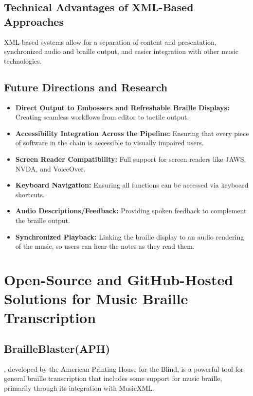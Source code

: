 \subsection{Technical Advantages of XML-Based Approaches}\label{ch10:ssec:xml-advantages}
\gls{XML}-based systems allow for a separation of content and presentation, synchronized audio and braille output, and easier integration with other music technologies.

\subsection{Future Directions and Research}\label{ch10:ssec:bmml-future-directions}
\begin{itemize}
	\item \textbf{Direct Output to Embossers and Refreshable Braille Displays:} Creating seamless workflows from editor to tactile output.
	\item \textbf{Accessibility Integration Across the Pipeline:} Ensuring that every piece of software in the chain is accessible to visually impaired users.
	\item \textbf{Screen Reader Compatibility:} Full support for screen readers like JAWS, NVDA, and VoiceOver.
	\item \textbf{Keyboard Navigation:} Ensuring all functions can be accessed via keyboard shortcuts.
	\item \textbf{Audio Descriptions/Feedback:} Providing spoken feedback to complement the braille output.
	\item \textbf{Synchronized Playback:} Linking the braille display to an audio rendering of the music, so users can hear the notes as they read them.
\end{itemize}

\section{Open-Source and GitHub-Hosted Solutions for Music Braille Transcription}\label{ch10:sec:open-source-solutions}

\subsection{BrailleBlaster(APH)}\label{ch10:ssec:brailleblaster}
, developed by the American Printing House for the Blind, is a powerful tool for general braille transcription that includes some support for music braille, primarily through its integration with \gls{MusicXML}.

